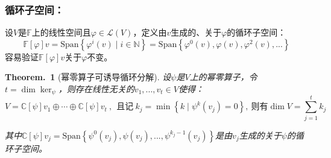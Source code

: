 \documentclass[zihao=5,UTF8]{report}
\theoremstyle{mystyle} %
\newtheorem{theorem}{Theorem.\,}
\begin{document}
\subsubsection{循环子空间：}
设$V$是$\mathbb{F}$上的线性空间且$\varphi \in \mathscr{L}(V)$，定义由$v$生成的、关于$\varphi$的循环子空间：
\begin{equation*}
    \mathbb{F}[\varphi]v = \text{Span}\left\{\varphi^i(v)\mid i \in \mathbb{N} \right\} = \text{Span}\left\{\varphi^0(v), \varphi(v), \varphi^2(v),... \right\}
\end{equation*}
容易验证$\mathbb{F}[\varphi]v$关于$\varphi$不变。


\begin{theorem}[幂零算子可诱导循环分解]\label{循环分解}
设$\psi$是$V$上的幂零算子，令$t = \dim \ker_{\psi} $，则存在线性无关的$v_1,...,v_t \in V$使得：
\begin{equation*}
    V = \mathbb{C}[\psi]v_1 \oplus \cdots \oplus \mathbb{C}[\psi]v_t\ ,\ \ \text{且记}\ k_j = \min \left\{k\mid \psi^k(v_j)=0 \right\},\ \text{则有}\dim V = \sum_{j=1}^{t} k_j
\end{equation*}\par
{\color{gray}\small 其中$\mathbb{C}[\psi]v_j = \text{Span}\left\{\psi^0(v_j),\psi(v_j),...,\psi^{k_j-1}(v_j) \right\}$是由$v_j$生成的关于$\psi$的循环子空间。}
\end{theorem}
\end{document}
